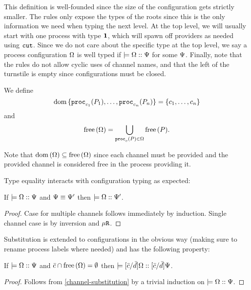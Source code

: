 This definition is well-founded since the size of the configuration gets strictly smaller. The rules only expose the types of the roots since this is the only information we need when typing the next level. At the top level, we will usually start with one process with type $\mathbf{1}$, which will spawn off providers as needed using $\texttt{cut}$. Since we do not care about the specific type at the top level, we say a process configuration $\Omega$ is well typed if $\models {\Omega} :: {\Psi}$ for some $\Psi$. Finally, note that the rules do not allow cyclic uses of channel names, and that the left of the turnstile is empty since configurations must be closed.


\begin{definition}
We define
\[\operatorname{dom} {\lbrace\mathtt{proc}_{c_1}(P_1), \ldots, \mathtt{proc}_{c_n}(P_n)\rbrace} = \lbrace c_1, \ldots, c_n\rbrace\]
and
\[\operatorname{free} {(\Omega)} = \bigcup_{\mathtt{proc}_{c}(P) \in \Omega}{\operatorname{free} { (P) }} .\]

Note that $\operatorname{dom} {(\Omega)} \subseteq \operatorname{free} {(\Omega)}$ since each channel must be provided and the provided channel is considered free in the process providing it.
\end{definition}

Type equality interacts with configuration typing as expected:
\begin{lemma}
  \label{typeeq-configuration}
  If $\models {\Omega} :: {\Psi}$ and $\Psi \equiv \Psi'$ then $\models {\Omega} :: {\Psi'}$.
\end{lemma}
\begin{proof}
  Case for multiple channels follows immediately by induction. Single channel case is by inversion and $\mu\texttt{R}$.
\end{proof}

Substitution is extended to configurations in the obvious way (making sure to rename process labels where needed) and has the following property:
\begin{lemma}
  \label{channel-substitution-configuration}
  If $\models {\Omega} :: {\Psi}$ and $\bar{c} \cap \operatorname{free} {(\Omega)} = \emptyset$ then $\models {\lbrack{\bar{c}}/{\bar{d}}\rbrack{\Omega}} :: {\lbrack{\bar{c}}/{\bar{d}}\rbrack{\Psi}}$.
\end{lemma}
\begin{proof}
  Follows from \cref{channel-substitution} by a trivial induction on $\models {\Omega} :: {\Psi}$.
\end{proof}

